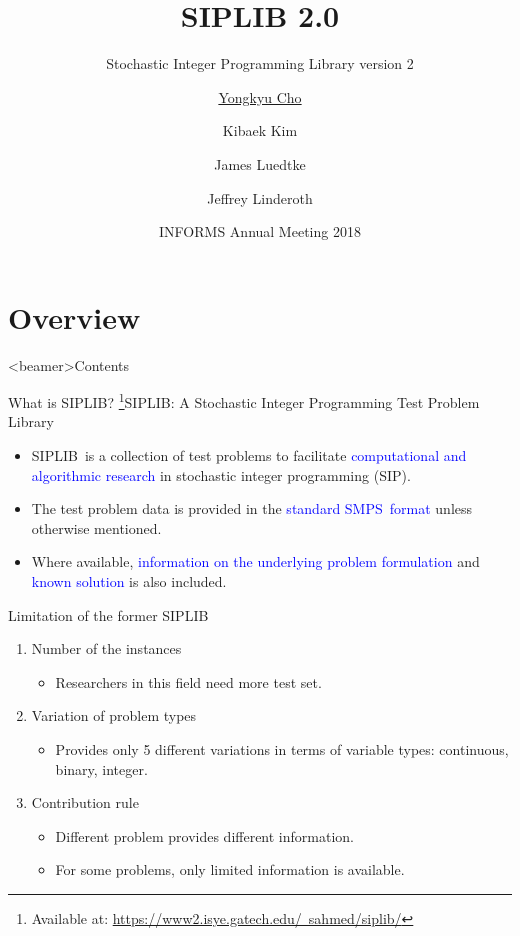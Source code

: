 \documentclass{beamer}
\title{\textbf{SIPLIB 2.0}}
\subtitle{Stochastic Integer Programming Library version 2}
\author{\underline{Yongkyu Cho}\inst{1}\inst{2} \and Kibaek Kim\inst{2} \\ \and James Luedtke\inst{3} \and Jeffrey Linderoth\inst{3}}
\institute[] %
{
	\inst{1}%
	Department of Industrial and Management Engineering\\
	Pohang University of Science and Technology
	\and
	\inst{2}%
	Mathematics and Computer Science Division\\
	Argonne National Laboratory
	\and
	\inst{3}%
	Department of Industrial and Systems Engineering\\
	University of Wisconsin-Madison
}
\date{INFORMS Annual Meeting 2018}
\newcommand{\siplib}{\textsf{SIPLIB}}
\newcommand{\smps}{\textsf{SMPS}}
\begin{document}
	
	\begin{frame}
		\titlepage
	\end{frame}

	\frame{
		\frametitle{Contents}
		\tableofcontents[hideothersubsections]
		\setcounter{tocdepth}{2}
	}
	
	\section{Overview}
	\begin{frame}<beamer>{Contents}
	\end{frame}	
	
	\begin{frame}{What is \siplib?}
	\footnote{\tiny Available at: \href{https://www2.isye.gatech.edu/~sahmed/siplib/}{https://www2.isye.gatech.edu/~sahmed/siplib/}}{\siplib}: A Stochastic Integer Programming Test Problem Library
	 	\begin{itemize}
	 		\item \siplib\ is a collection of test problems to facilitate \textcolor{blue}{computational and algorithmic research} in stochastic integer programming (SIP).
	 		\item The test problem data is provided in the \textcolor{blue}{standard \smps\ format} unless otherwise mentioned.
	 		\item Where available, \textcolor{blue}{information on the underlying problem formulation} and \textcolor{blue}{known solution} is also included.
	 	\end{itemize}
	\end{frame}
	
	\begin{frame}{Limitation of the former \siplib}
		\begin{enumerate}
			\item Number of the instances
			\begin{itemize}
				\item Researchers in this field need more test set.
			\end{itemize}
			\item Variation of problem types
			\begin{itemize}
				\item Provides only 5 different variations in terms of variable types: continuous, binary, integer.
			\end{itemize}
			\item Contribution rule
			\begin{itemize}
				\item Different problem provides different information.
				\item For some problems, only limited information is available.
			\end{itemize}
		\end{enumerate}
	\end{frame}
\end{document}
